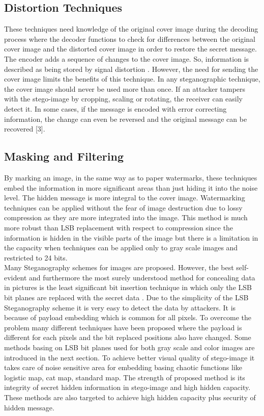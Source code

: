 \documentclass[conference]{IEEEtran}
\begin{document}
\subsection{Distortion Techniques}
These techniques need knowledge of the original cover image during the decoding process where the decoder functions to check for differences between the original cover image and the distorted cover image in order to restore the secret  message. The encoder adds a sequence of changes to the cover image. So, information is  described as being stored by signal distortion \cite{b2}. However, the need for sending the cover image limits the benefits of this technique. In any steganographic technique, the cover image should never be used more than once. If an attacker tampers with the stego-image by cropping, scaling or rotating, the receiver can easily detect it. In some cases, if the message is encoded with error correcting information, the change can even be reversed and the original message can be recovered [3].

\subsection{Masking and Filtering}
By marking an image, in the same way as to paper watermarks, these techniques embed the information in more significant areas than just hiding it into the noise level. The hidden message is more integral to the cover image. Watermarking techniques can be applied without the fear of image destruction due to lossy compression as they are more integrated into the image. This method is much more robust than LSB replacement with respect to compression since the information is hidden in the visible parts of the image but there is a limitation in the capacity when techniques can be applied only to gray scale images and restricted to 24 bits. \\
	
\indent Many Steganography schemes for images are proposed. However, the best self-evident and furthermore the most surely understood method for concealing data in pictures is the least significant bit insertion technique in which only the LSB bit planes are replaced with the secret data \cite{b1}. Due to the simplicity of the LSB Steganography scheme it is very easy to detect the data by attackers. It is because of payload embedding which is common for all pixels. To overcome the problem many different techniques have been proposed where the payload is different for each pixels and the bit replaced positions also have changed. Some methods basing on LSB bit planes used for both gray scale and color images are introduced in the next section. To achieve better visual quality of stego-image it takes care of noise sensitive area for embedding basing chaotic functions like logistic map, cat map, standard map. The strength of proposed method is its integrity of secret hidden information in stego-image and high hidden capacity. These methods are also targeted to achieve high hidden capacity plus security of hidden message.  
\end{document}
